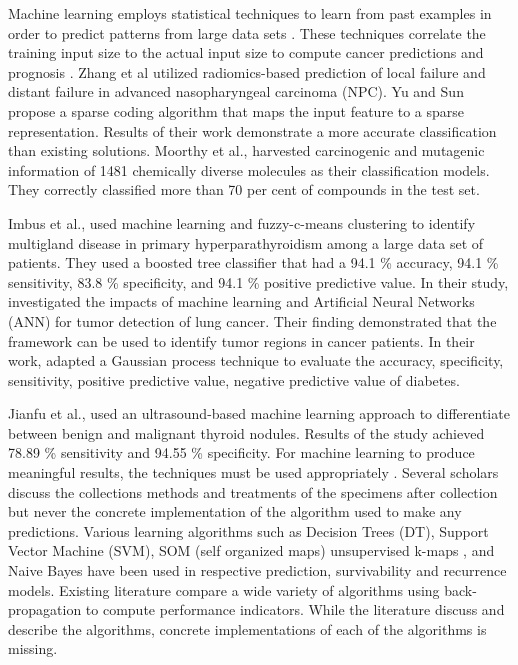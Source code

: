 \documentclass[journal]{IEEEtran}
\begin{document}
Machine learning employs statistical techniques to learn from past examples in order to predict patterns from large data sets \cite{cruz2006applications}.
These techniques correlate the training input size to the actual input size to compute cancer predictions and prognosis \cite{bartsch2016use}. 
Zhang et al \cite{zhang2017radiomic} utilized radiomics-based prediction of local failure and distant failure in advanced nasopharyngeal carcinoma (NPC). 
Yu and Sun \cite{yu2017sparse} propose a sparse coding algorithm that maps the input feature to a sparse representation. Results of their work demonstrate a more accurate classification than existing solutions.
Moorthy et al., \cite{moorthy2017classification} harvested carcinogenic and mutagenic information of 1481 chemically diverse molecules as their classification models. They correctly classified more than 70 per cent  of compounds in the test set.

Imbus et al., \cite{imbus2017machine} used machine learning and fuzzy-c-means clustering to identify multigland disease in primary hyperparathyroidism among a large data set of patients. They used a boosted tree classifier that had a 94.1 \%  accuracy, 94.1 \% sensitivity, 83.8 \% specificity, and 94.1 \% positive predictive value.
In their study, \cite{kawata2017impact} investigated the impacts of machine learning and Artificial Neural Networks (ANN) for tumor detection of lung cancer. Their finding demonstrated that the framework can be used to identify tumor regions in cancer patients.
In their work, \cite{maniruzzaman2017comparative} adapted a Gaussian process technique to evaluate the accuracy, specificity, sensitivity, positive predictive value, negative predictive value of diabetes.

Jianfu et al., \cite{xia2017ultrasound} used an ultrasound-based machine learning approach to differentiate between benign and malignant thyroid nodules. Results of the study achieved 78.89 \% sensitivity and 94.55 \% specificity.
For machine learning to produce meaningful results, the techniques must be used appropriately \cite{sattlecker2014current}.
Several scholars discuss the collections methods and treatments of the specimens after collection but never the concrete implementation of the algorithm used to make any predictions. 
Various learning algorithms such as Decision Trees (DT), Support Vector Machine (SVM), SOM (self organized maps) unsupervised k-maps %
, and Naive Bayes have been used in respective prediction, survivability and recurrence models.
Existing literature compare a wide variety of algorithms using back-propagation to compute performance indicators.  While the literature  discuss and describe the algorithms, concrete implementations of each of the algorithms is missing. 
\end{document}
